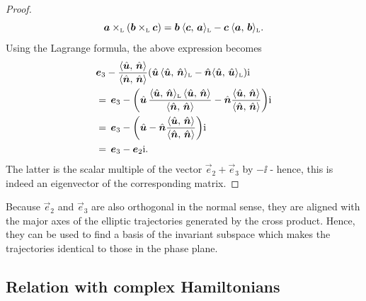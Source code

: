 \begin{proof}
    $$ 
        \lorcrossp{\vec{a}}{\qty(\lorcrossp{\vec{b}}{\vec{c}})} 
       = \vec{b}\:\lorinner{\vec{c}}{\vec{a}} - \vec{c}\:\lorinner{\vec{a}}{\vec{b}}. 
    $$
Using the Lagrange formula, the above expression becomes
    \begin{equation*}
        \begin{split}
            & \vec{e}_3 - \frac{ \inner{\uvec{u}}{\uvec{n}} }{ \inner{\uvec{n}}{\uvec{n}} }\qty(\uvec{u}\,\lorinner{\uvec{u}}{\uvec{n}} - \uvec{n}\lorinner{\uvec{u}}{\uvec{u}})\ii \\
            & =\, \vec{e}_3 - \qty(\uvec{u}\,\frac{ \lorinner{\uvec{u}}{\uvec{n}} \, \inner{\uvec{u}}{\uvec{n}} }{ \inner{\uvec{n}}{\uvec{n}} } - \uvec{n}\frac{ \inner{\uvec{u}}{\uvec{n}} }{ \inner{\uvec{n}}{\uvec{n}} })\ii \\
            & =\, \vec{e}_3 - \qty(\uvec{u} - \uvec{n}\frac{ \inner{\uvec{u}}{\uvec{n}} }{ \inner{\uvec{n}}{\uvec{n}} })\ii \\
            & =\, \vec{e}_3 - \vec{e}_2\ii. 
        \end{split}
    \end{equation*}
    The latter is the scalar multiple of the vector $\vec{e}_2 + \vec{e}_3$ by $-\ii$ - hence, this is indeed an eigenvector of the corresponding matrix.
\end{proof}
Because $\vec{e}_2$ and $\vec{e}_3$ are also orthogonal in the normal sense, they are aligned with the major axes of the elliptic trajectories generated by the cross product. Hence, they can be used to find a basis of the invariant subspace which makes the trajectories identical to those in the phase plane.

\subsection{Relation with complex Hamiltonians}
\label{ssec:complex_ham}
